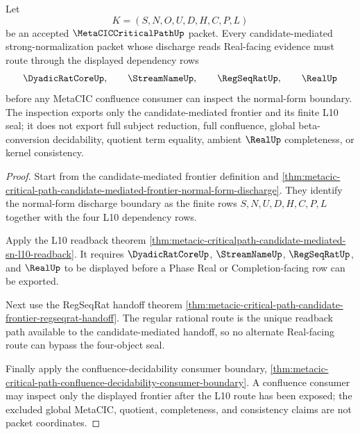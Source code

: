 \begin{theorem}
\label{thm:metacic-criticalpath-candidate-sn-l10-dependency-seal}
Let
$$
K=(S,N,O,U,D,H,C,P,L)
$$
be an accepted $\MetaCICCriticalPathUp$ packet. Every candidate-mediated strong-normalization packet whose discharge reads Real-facing evidence must route through the displayed dependency rows
$$
\DyadicRatCoreUp,\qquad
\StreamNameUp,\qquad
\RegSeqRatUp,\qquad
\RealUp
$$
before any MetaCIC confluence consumer can inspect the normal-form boundary. The inspection exports only the candidate-mediated frontier and its finite L10 seal; it does not export full subject reduction, full confluence, global beta-conversion decidability, quotient term equality, ambient $\RealUp$ completeness, or kernel consistency.
\end{theorem}
\begin{proof}
Start from the candidate-mediated frontier definition and \autoref{thm:metacic-critical-path-candidate-mediated-frontier-normal-form-discharge}. They identify the normal-form discharge boundary as the finite rows $S,N,U,D,H,C,P,L$ together with the four L10 dependency rows.

Apply the L10 readback theorem \autoref{thm:metacic-criticalpath-candidate-mediated-sn-l10-readback}. It requires $\DyadicRatCoreUp$, $\StreamNameUp$, $\RegSeqRatUp$, and $\RealUp$ to be displayed before a Phase Real or Completion-facing row can be exported.

Next use the RegSeqRat handoff theorem \autoref{thm:metacic-critical-path-candidate-frontier-regseqrat-handoff}. The regular rational route is the unique readback path available to the candidate-mediated handoff, so no alternate Real-facing route can bypass the four-object seal.

Finally apply the confluence-decidability consumer boundary, \autoref{thm:metacic-critical-path-confluence-decidability-consumer-boundary}. A confluence consumer may inspect only the displayed frontier after the L10 route has been exposed; the excluded global MetaCIC, quotient, completeness, and consistency claims are not packet coordinates.
\end{proof}

